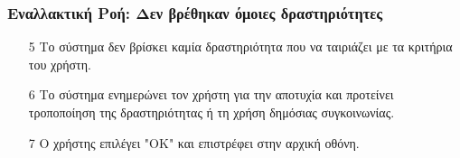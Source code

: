 \subsubsection{Εναλλακτική Ροή: Δεν βρέθηκαν όμοιες δραστηριότητες}

\begin{enumerate}
    \item[5] Το σύστημα δεν βρίσκει καμία δραστηριότητα που να ταιριάζει με τα
        κριτήρια του χρήστη.
    \item[6] Το σύστημα ενημερώνει τον χρήστη για την αποτυχία και προτείνει
        τροποποίηση της δραστηριότητας ή τη χρήση δημόσιας συγκοινωνίας.
    \item[7] Ο χρήστης επιλέγει "ΟΚ" και επιστρέφει στην αρχική οθόνη.
\end{enumerate}

